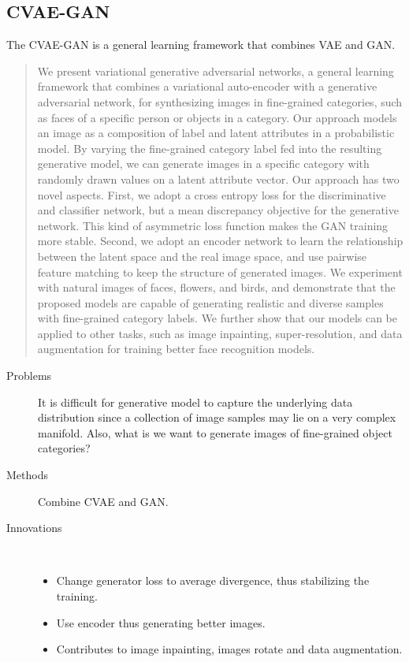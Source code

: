 \documentclass[12pt]{utils/mydoc}
\begin{document}
\subsection{CVAE-GAN}

The CVAE-GAN\cite{bao2017cvae} is a general learning framework that combines
VAE and GAN.

\begin{abstract}
  We present variational generative adversarial networks,
  a general learning framework that combines a variational
  auto-encoder with a generative adversarial network, for
  synthesizing images in fine-grained categories, such as
  faces of a specific person or objects in a category. Our
  approach models an image as a composition of label and
  latent attributes in a probabilistic model. By varying the
  fine-grained category label fed into the resulting generative
  model, we can generate images in a specific category with
  randomly drawn values on a latent attribute vector. Our
  approach has two novel aspects. First, we adopt a cross entropy 
  loss for the discriminative and classifier network, but
  a mean discrepancy objective for the generative network.
  This kind of asymmetric loss function makes the GAN training 
  more stable. Second, we adopt an encoder network to
  learn the relationship between the latent space and the real
  image space, and use pairwise feature matching to keep the
  structure of generated images. We experiment with natural
  images of faces, flowers, and birds, and demonstrate that
  the proposed models are capable of generating realistic and
  diverse samples with fine-grained category labels. We further 
  show that our models can be applied to other tasks,
  such as image inpainting, super-resolution, and data 
  augmentation for training better face recognition models.
\end{abstract}

\begin{description}
  \item[Problems] It is difficult for generative model to capture the underlying
    data distribution since a collection of image samples may lie on a very
    complex manifold. Also, what is we want to generate images of fine-grained
    object categories?
  \item[Methods] Combine CVAE and GAN.
  \item[Innovations] ~
    \begin{itemize}
      \item Change generator loss to average divergence, thus stabilizing the training.
      \item Use encoder thus generating better images.
      \item Contributes to image inpainting, images rotate and data augmentation.
    \end{itemize}
\end{description}
\end{document}
